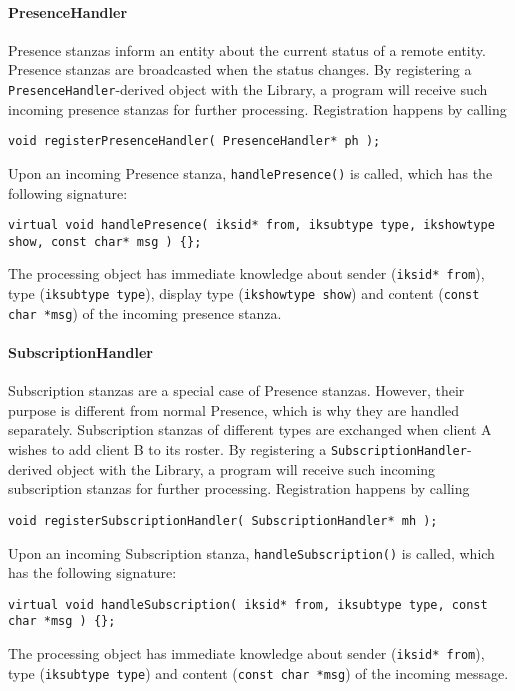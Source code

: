 \paragraph{PresenceHandler}
Presence stanzas inform an entity about the current status of a remote entity. Presence stanzas are broadcasted when the status changes. By registering a \texttt{PresenceHandler}-derived object with the Library, a program will receive such incoming presence stanzas for further processing. Registration happens by calling
\begin{flushleft}
\texttt{void registerPresenceHandler( PresenceHandler* ph );}
\end{flushleft}
Upon an incoming Presence stanza, \texttt{handlePresence()} is called, which has the following signature:
\begin{flushleft}
\texttt{virtual void handlePresence( iksid* from, iksubtype type, ikshowtype show, const char* msg ) \{\};}
\end{flushleft}
The processing object has immediate knowledge about sender (\texttt{iksid* from}), type (\texttt{iksubtype type}), display type (\texttt{ikshowtype show}) and content (\texttt{const char *msg}) of the incoming presence stanza.

\paragraph{SubscriptionHandler}
Subscription stanzas are a special case of Presence stanzas. However, their purpose is different from normal Presence, which is why they are handled separately. Subscription stanzas of different types are exchanged when client A wishes to add client B to its roster. By registering a \texttt{SubscriptionHandler}-derived object with the Library, a program will receive such incoming subscription stanzas for further processing. Registration happens by calling
\begin{flushleft}
\texttt{void registerSubscriptionHandler( SubscriptionHandler* mh );}
\end{flushleft}
Upon an incoming Subscription stanza, \texttt{handleSubscription()} is called, which has the following signature:
\begin{flushleft}
\texttt{virtual void handleSubscription( iksid* from, iksubtype type, const char *msg ) \{\};}
\end{flushleft}
The processing object has immediate knowledge about sender (\texttt{iksid* from}), type (\texttt{iksubtype type}) and content (\texttt{const char *msg}) of the incoming message.


